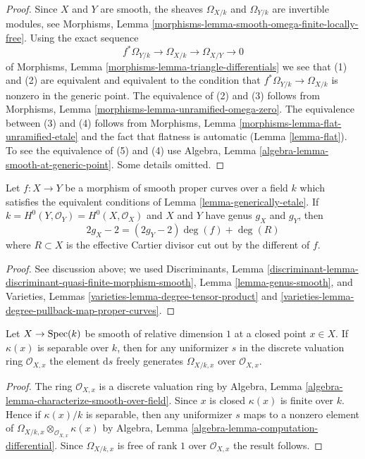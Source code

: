 \begin{proof}
Since $X$ and $Y$ are smooth, the sheaves $\Omega_{X/k}$ and
$\Omega_{Y/k}$ are invertible modules, see
Morphisms, Lemma \ref{morphisms-lemma-smooth-omega-finite-locally-free}.
Using the exact sequence
$$
f^*\Omega_{Y/k} \longrightarrow \Omega_{X/k}
\longrightarrow \Omega_{X/Y} \longrightarrow 0
$$
of Morphisms, Lemma \ref{morphisms-lemma-triangle-differentials}
we see that (1) and (2) are equivalent and equivalent to the
condition that $f^*\Omega_{Y/k} \to \Omega_{X/k}$ is nonzero
in the generic point. The equivalence of (2) and (3) follows
from Morphisms, Lemma \ref{morphisms-lemma-unramified-omega-zero}.
The equivalence between (3) and (4) follows from
Morphisms, Lemma \ref{morphisms-lemma-flat-unramified-etale}
and the fact that flatness is automatic
(Lemma \ref{lemma-flat}).
To see the equivalence of (5) and (4)
use Algebra, Lemma \ref{algebra-lemma-smooth-at-generic-point}.
Some details omitted.
\end{proof}

\begin{lemma}
\label{lemma-rh}
Let $f : X \to Y$ be a morphism of smooth proper curves
over a field $k$ which satisfies the equivalent conditions of
Lemma \ref{lemma-generically-etale}. If
$k = H^0(Y, \mathcal{O}_Y) = H^0(X, \mathcal{O}_X)$
and $X$ and $Y$ have genus $g_X$ and $g_Y$, then
$$
2g_X - 2 = (2g_Y - 2) \deg(f) + \deg(R)
$$
where $R \subset X$ is the effective Cartier divisor cut out by
the different of $f$.
\end{lemma}

\begin{proof}
See discussion above; we used
Discriminants, Lemma
\ref{discriminant-lemma-discriminant-quasi-finite-morphism-smooth},
Lemma \ref{lemma-genus-smooth}, and
Varieties, Lemmas \ref{varieties-lemma-degree-tensor-product} and
\ref{varieties-lemma-degree-pullback-map-proper-curves}.
\end{proof}

\begin{lemma}
\label{lemma-uniformizer-works}
Let $X \to \mathop{\mathrm{Spec}}(k)$ be smooth of relative dimension $1$ at a closed
point $x \in X$. If $\kappa(x)$ is separable over $k$, then for
any uniformizer $s$ in the discrete valuation ring $\mathcal{O}_{X, x}$
the element $\text{d}s$ freely generates $\Omega_{X/k, x}$
over $\mathcal{O}_{X, x}$.
\end{lemma}

\begin{proof}
The ring $\mathcal{O}_{X, x}$ is a discrete valuation ring by
Algebra, Lemma \ref{algebra-lemma-characterize-smooth-over-field}.
Since $x$ is closed $\kappa(x)$ is finite over $k$. Hence if
$\kappa(x)/k$ is separable, then any uniformizer $s$
maps to a nonzero element of
$\Omega_{X/k, x} \otimes_{\mathcal{O}_{X, x}} \kappa(x)$ by
Algebra, Lemma \ref{algebra-lemma-computation-differential}.
Since $\Omega_{X/k, x}$ is free of rank $1$ over $\mathcal{O}_{X, x}$
the result follows.
\end{proof}


